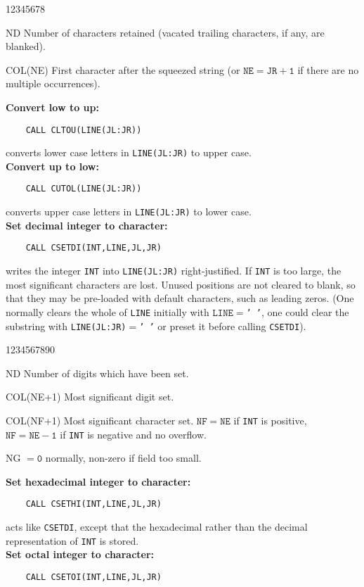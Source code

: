 \begin{DLtt}{12345678}
\item[ND] Number of characters retained (vacated trailing characters,
if any, are blanked).
\item[COL(NE)] First character after the squeezed string
(or $\mathtt{NE=JR+1}$ if there are no multiple occurrences).
\end{DLtt}
{\bf Convert low to up:}
\begin{verbatim}
    CALL CLTOU(LINE(JL:JR))
\end{verbatim}
converts lower case letters in {\tt LINE(JL:JR)} to upper case. \\[2mm]
{\bf Convert up to low:}
\begin{verbatim}
    CALL CUTOL(LINE(JL:JR))
\end{verbatim}
 converts upper case letters in {\tt LINE(JL:JR)} to lower case. \\[2mm]
{\bf Set decimal integer to character:}
\begin{verbatim}
    CALL CSETDI(INT,LINE,JL,JR)
\end{verbatim}
writes the integer {\tt INT} into {\tt LINE(JL:JR)} right-justified.
If {\tt INT} is too large, the most significant characters are lost.
Unused positions are not cleared to blank, so that they may be
pre-loaded with default characters, such as leading zeros.
(One normally clears the whole of {\tt LINE} initially with
$\mathtt{LINE}=${\tt ' '}, one could clear the substring with
{\tt LINE(JL:JR)}$=${\tt ' '} or preset it before calling
{\tt CSETDI}).
\begin{DLtt}{1234567890}
\item[ND] Number of digits which have been set.
\item[COL(NE+1)] Most significant digit set.
\item[COL(NF+1)] Most significant character set. $\mathtt{NF=NE}$ if
{\tt INT} is positive, $\mathtt{NF=NE-1}$ if {\tt INT} is negative and no
overflow.
\item[NG] $\mathtt{=0}$ normally, non-zero if field too small.
\end{DLtt}
{\bf Set hexadecimal integer to character:}
\begin{verbatim}
    CALL CSETHI(INT,LINE,JL,JR)
\end{verbatim}
acts like {\tt CSETDI}, except that the hexadecimal rather than
the decimal representation of {\tt INT} is stored.
\\[2mm]
{\bf Set octal integer to character:}
\begin{verbatim}
    CALL CSETOI(INT,LINE,JL,JR)
\end{verbatim}
